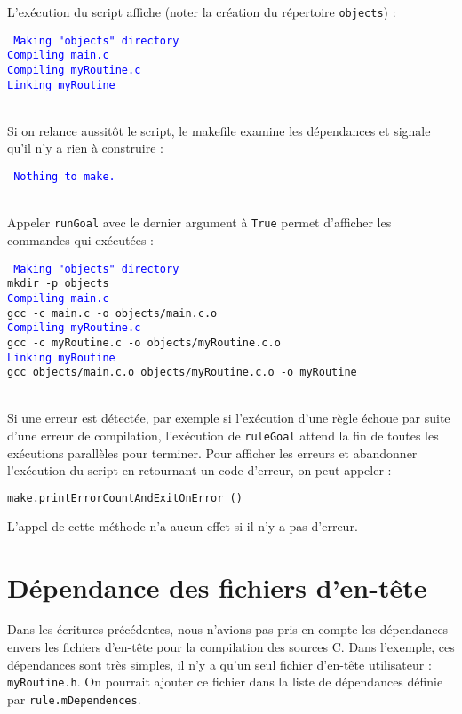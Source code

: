 \documentclass[a4paper,12pt,obeyspaces,openany]{extarticle}
\begin{document}
L'exécution du script affiche (noter la création du répertoire \texttt{objects}) :

\noindent\texttt{\footnotesize
\textcolor{blue}{Making "objects" directory}\\
\textcolor{blue}{Compiling main.c}\\
\textcolor{blue}{Compiling myRoutine.c}\\
\textcolor{blue}{Linking myRoutine}
}

~\\Si on relance aussitôt le script, le makefile examine les dépendances et signale qu'il n'y a rien à construire :

\noindent\texttt{\footnotesize
\textcolor{blue}{Nothing to make.}
}



~\\Appeler \texttt{runGoal} avec le dernier argument à \texttt{True} permet d'afficher les commandes qui exécutées :

\noindent\texttt{\footnotesize
\textcolor{blue}{Making "objects" directory}\\
mkdir -p objects\\
\textcolor{blue}{Compiling main.c}\\
gcc -c main.c -o objects/main.c.o\\
\textcolor{blue}{Compiling myRoutine.c}\\
gcc -c myRoutine.c -o objects/myRoutine.c.o\\
\textcolor{blue}{Linking myRoutine}\\
gcc objects/main.c.o objects/myRoutine.c.o -o myRoutine
}

~\\Si une erreur est détectée, par exemple si l'exécution d'une règle échoue par suite d'une erreur de compilation, l'exécution de \texttt{ruleGoal} attend la fin de toutes les exécutions parallèles pour terminer. Pour afficher les erreurs et abandonner l'exécution du script en retournant un code d'erreur, on peut appeler :
\begin{lstlisting}[language=py]
make.printErrorCountAndExitOnError ()
\end{lstlisting}
L'appel de cette méthode n'a aucun effet si il n'y a pas d'erreur.

\section{Dépendance des fichiers d'en-tête}


Dans les écritures précédentes, nous n'avions pas pris en compte les dépendances envers les fichiers d'en-tête pour la compilation des sources C. Dans l'exemple, ces dépendances sont très simples, il n'y a qu'un seul fichier d'en-tête utilisateur : \texttt{myRoutine.h}. On pourrait ajouter ce fichier dans la liste de dépendances définie par \texttt{rule.mDependences}.
\end{document}

